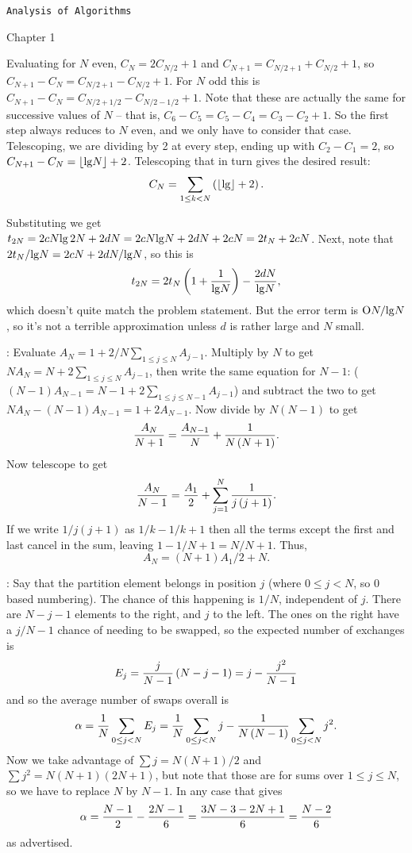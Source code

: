 \def\newprob#1{\vskip 0.12in \noindent {\bf #1}}

\topglue 0.5in
\centerline {\tt Analysis of Algorithms}
\vskip 0.3in
\centerline {Chapter 1}
\vskip 0.2in

\newprob{Problem 1.4} Evaluating for $N$ even,
$C_N = 2 C_{N/2} + 1$ and $C_{N+1} = C_{N/2 + 1} + C_{N/2} + 1$,
so $C_{N+1} - C_N = C_{N/2 + 1} - C_{N/2} + 1$.
For $N$ odd this is $C_{N+1} - C_N = C_{N/2 + 1/2} - C_{N/2 - 1/2} + 1$.
Note that these are actually the same for successive values of $N$ --
that is, $C_6 - C_5 = C_5 - C_4 = C_3 - C_2 + 1$.  So the first
step always reduces to $N$ even, and we only have to consider
that case.  Telescoping, we are dividing by 2 at every step, ending
up with $C_2 - C_1 = 2$, so $C_{N+1} - C_{N} = \lfloor {\rm lg} N
\rfloor + 2$.  Telescoping that in turn gives the desired result:
$$
 C_N = \sum_{1 \le k < N} \left(\lfloor {\rm lg} \rfloor + 2\right).
$$

\newprob{ Problem 1.7} Substituting we get
$t_{2N} = 2 c N {\rm lg}\, 2 N + 2 d N = 2 c N {\lg} N 
+ 2 d N + 2 c N = 2 t_N + 2 c N$.  Next, note that
$2 t_N / {\rm lg} N = 2 c N + 2 d N / {\rm lg} N$, so this
is 
$$
 t_{2N} = 2 t_{N} \left(1 + {1 \over {\rm lg} N}\right) - {2 d N \over {\rm lg} N},
$$
which doesn't quite match the problem statement.  But the
error term is ${\rm O} N / {\rm lg} N$, so it's not a terrible approximation
unless $d$ is rather large and $N$ small.

\newprob{Problem 1.14}: Evaluate 
$A_N = 1 + 2 / N \sum_{1 \le j \le N} A_{j-1}$.
Multiply by $N$ to get $N A_N = N + 2 \sum_{1 \le j \le N} A_{j-1}$,
then write the same equation for $N-1$: ($\left(N - 1\right) 
A_{N-1} = N  - 1 + 2 \sum_{1 \le j \le N-1} A_{j-1}$) and subtract the two
to get $N A_N - \left(N - 1\right) A_{N-1} = 1 + 2 A_{N-1}$.  Now
divide by $N \left(N - 1\right)$ to get
$$
{A_N \over N  + 1} = {A_{N-1} \over N} + {1 \over N \left(N + 1\right)}.
$$
Now telescope to get
$$
 {A_N \over N - 1} = {A_1 \over 2} + \sum_{j = 1}^N {1 \over j \left(j + 1\right)}.
$$
If we write $1 / j \left(j + 1\right)$ as $1 / k - 1 / k+1$ then all the terms except
the first and last cancel in the sum, leaving $1 - 1 / N + 1 = N / N + 1$.
Thus,
$$
 A_N = \left(N + 1\right) A_1 / 2 + N .
$$

\newprob{Problem 1.15}: Say that the partition
element belongs in position $j$ (where $0 \le j < N$, so 0 based
numbering).  The chance of this happening is $1/N$, independent
of $j$.  There are $N - j - 1$ elements to the right, and $j$ to the left.
The ones on the right have a $j / N-1$ chance of needing to be
swapped, so the expected number of exchanges is 
$$
 E_j = {j \over N - 1} \left(N - j - 1\right) = j - {j^2 \over N - 1}
$$
and so the average number of swaps overall is
$$
  \alpha = {1 \over N} \sum_{0 \le j < N} E_j =
   {1 \over N} \sum_{0 \le j < N} j - {1 \over N \left(N - 1\right)} \sum_{0 \le j < N} j^2.
$$
Now we take advantage of $\sum j = N \left(N + 1\right) / 2$
and $\sum j^2 = N \left(N + 1\right) \left(2 N + 1\right)$, but
note that those are for sums over $1 \le j \le N$, so we have to
replace $N$ by $N-1$.  In any case that gives
$$
 \alpha = {N - 1 \over 2} - {2 N - 1 \over 6} = {3 N  - 3 - 2 N + 1 \over 6} 
  = {N - 2 \over 6}
$$
as advertised.

